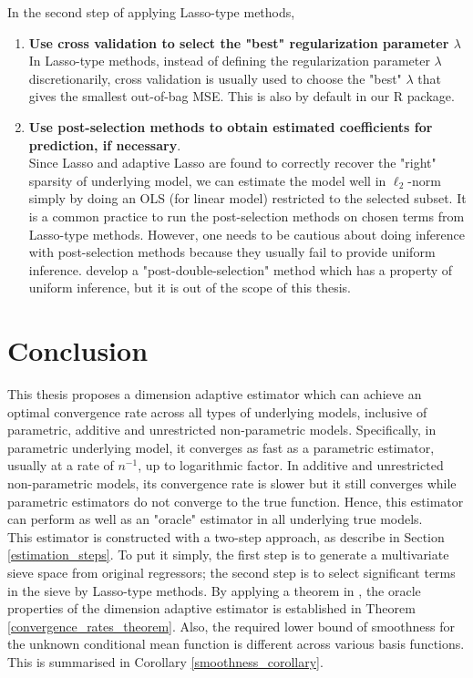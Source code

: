 \documentclass[12pt, a4paper]{article}
\theoremstyle{MAstyle} \newtheorem{assumption}{Assumption}[section]
\theoremstyle{MAstyle} \newtheorem{definition}{Definition}[section]
\theoremstyle{MAstyle} \newtheorem{theorem}{Theorem}[section]
\theoremstyle{MAstyle} \newtheorem{corollary}{Corollary}[section]
\begin{document}
            In the second step of applying Lasso-type methods,
            \begin{enumerate}[label=\textbf{(\alph*)}, noitemsep]
                \item \textbf{Use cross validation to select the "best" regularization parameter $\lambda$}\\
                In Lasso-type methods, instead of defining the regularization parameter $\lambda$ discretionarily, cross validation is usually used to choose the "best" $\lambda$ that gives the smallest out-of-bag MSE. This is also by default in our R package.
                \item \textbf{Use post-selection methods to obtain estimated coefficients for prediction, if necessary}.\\
                Since Lasso and adaptive Lasso are found to correctly recover the "right" sparsity of underlying model, we can estimate the model well in $\ell_2$-norm simply by doing an OLS (for linear model) restricted to the selected subset. It is a common practice to run the post-selection methods on chosen terms from Lasso-type methods. However, one needs to be cautious about doing inference with post-selection methods because they usually fail to provide uniform inference. \cite{Belloni_Chernozhukov_Hansen_2013} develop a "post-double-selection" method which has a property of uniform inference, but it is out of the scope of this thesis.
            \end{enumerate}
            
        \newpage
        \section{Conclusion}\label{conclusion}
            This thesis proposes a dimension adaptive estimator which can achieve an optimal convergence rate across all types of underlying models, inclusive of parametric, additive and unrestricted non-parametric models. Specifically, in parametric underlying model, it converges as fast as a parametric estimator, usually at a rate of $n^{-1}$, up to logarithmic factor. In additive and unrestricted non-parametric models, its convergence rate is slower but it still converges while parametric estimators do not converge to the true function. Hence, this estimator can perform as well as an "oracle" estimator in all underlying true models.\\

            This estimator is constructed with a two-step approach, as describe in Section \ref{estimation_steps}. To put it simply, the first step is to generate a multivariate sieve space from original regressors; the second step is to select significant terms in the sieve by Lasso-type methods. By applying a theorem in \cite{Bunea_2007},
            the oracle properties of the dimension adaptive estimator is established in Theorem \ref{convergence_rates_theorem}. Also, the required lower bound of smoothness for the unknown conditional mean function is different across various basis functions. This is summarised in Corollary \ref{smoothness_corollary}. \\
\end{document}

